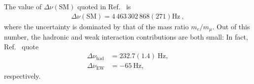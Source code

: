 The value of $\Delta \nu(\text{SM})$ quoted in Ref.~\cite{CODATA}
is
%
\begin{align}
 \Delta \nu (\text{SM}) =  
   4 \, 463 \, 302 \, 868 (271) \text{Hz}~,
\end{align}
%
where the uncertainty is dominated by that of the 
mass ratio $m_e/m_\mu$.   Out of this number, the hadronic and
weak interaction contributions are both small: In fact,
Ref.~\cite{CODATA} quote 
%
\begin{align}
 \Delta \nu_{\text{had}} &= 232.7 (1.4) ~ {\text{Hz}} , \\
 \Delta \nu_{\text{EW}}  &= -65 ~ {\text{Hz}} , 
\end{align}
%
respectively. 



